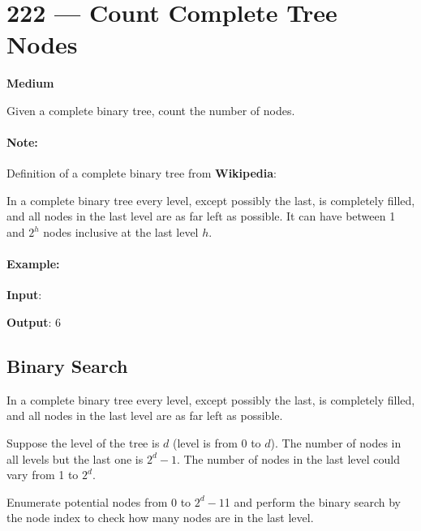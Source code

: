 \section{222 --- Count Complete Tree Nodes}

\textbf{Medium}

Given a complete binary tree, count the number of nodes.

\paragraph{Note:}

Definition of a complete binary tree from \textbf{Wikipedia}:

In a complete binary tree every level, except possibly the last, is completely filled, and all nodes in the last level are as far left as possible. It can have between 1 and $2^h$ nodes inclusive at the last level $h$.

\paragraph{Example:}
\begin{flushleft}


\textbf{Input}: 

\begin{figure}[H]
\end{figure}

\textbf{Output}: 6
\end{flushleft}

\subsection{Binary Search}
In a complete binary tree every level, except possibly the last, is completely filled, and all nodes in the last level are as far left as possible.

Suppose the level of the tree is $d$ (level is from 0 to $d$). The number of nodes in all levels but the last one is $2^d - 1$. The number of nodes in the last level could vary from 1 to $2^d$.

Enumerate potential nodes from 0 to $2^d - 1$1 and perform the binary search by the node index to check how many nodes are in the last level.

